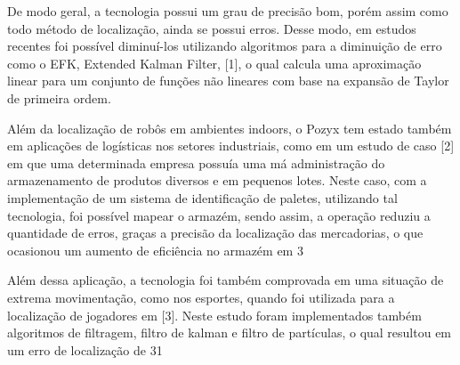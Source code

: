 De modo geral, a tecnologia possui um grau de precisão bom, porém assim como todo método de localização, ainda se possui erros. Desse modo, em estudos recentes foi possível diminuí-los utilizando algoritmos para a diminuição de erro como o EFK, Extended Kalman Filter, [1], o qual calcula uma aproximação linear para um conjunto de funções não lineares com base na expansão de Taylor de primeira ordem.

Além da localização de robôs em ambientes indoors, o Pozyx tem estado também em aplicações de logísticas nos setores industriais, como em um estudo de caso [2] em que uma determinada empresa possuía uma má administração do  armazenamento de produtos diversos e em pequenos lotes. Neste caso, com a implementação de um sistema de identificação de paletes, utilizando tal tecnologia, foi possível mapear o armazém, sendo assim, a operação reduziu a quantidade de erros, graças a precisão da localização das mercadorias, o que ocasionou um aumento de eficiência no armazém em 3%

Além dessa aplicação, a tecnologia foi também comprovada em uma situação de extrema movimentação, como nos esportes, quando foi utilizada para a localização de jogadores em [3]. Neste estudo foram implementados também algoritmos de filtragem, filtro de kalman e filtro de partículas, o qual resultou em um erro de localização de 31%




